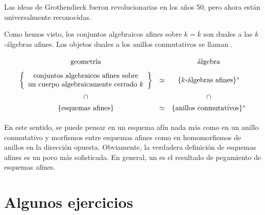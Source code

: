 \documentclass{article}
\numberwithin{equation}{section}
\theoremstyle{definition}
\begin{document}
Las ideas de Grothendieck fueron revolucionarias en los años 50, pero ahora
están universalmente reconocidas.

Como hemos visto, los conjuntos algebraicos afines sobre $k = \overline{k}$ son
duales a las $k$-álgebras afines. Los objetos duales a los anillos conmutativos
se llaman .

\[ \begin{tikzcd}[row sep=0.1em, column sep=0.1em]
    \text{geometría} & & \text{álgebra} \\
    \\
    {\left\{\begin{array}{c}\text{conjuntos algebraicos afines sobre}\\\text{un cuerpo algebraicamente cerrado }k\end{array}\right\}} & \cequiv & \{k\text{-álgebras afines}\}^\circ\\
    \cap & & \cap \\
    \{\text{esquemas afines}\} & \cequiv & \{\text{anillos conmutativos}\}^\circ
  \end{tikzcd} \]

En este sentido, se puede pensar en un esquema afín nada más como en un anillo
conmutativo y morfismos entre esquemas afines como en homomorfismos de anillos
en la dirección opuesta. Obviamente, la verdadera definición de esquemas afines
es un poco más sofisticada. En general, un  es el resultado
de pegamiento de esquemas afines.


\pagebreak

\appendix
\section{Algunos ejercicios}




\pagebreak

{\small}
\end{document}
